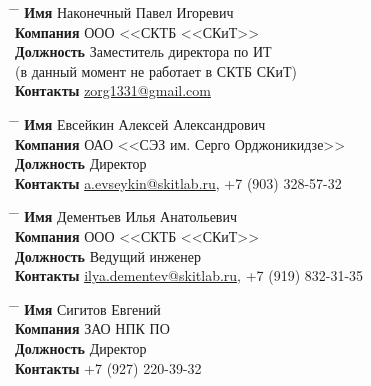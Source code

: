 \parbox{0.4\textwidth}{ %
\begin{tabbing}
\hspace{2.75cm} \= \hspace{4cm} \= \kill %
{\bf Имя} \> Наконечный Павел Игоревич \\ %
{\bf Компания} \> ООО <<СКТБ <<СКиТ>> \\ %
{\bf Должность} \> Заместитель директора по ИТ\\
(в данный момент не работает в СКТБ СКиТ) \\ %
{\bf Контакты} \> \href{mailto:zorg1331@gmail.com}{zorg1331@gmail.com} %
\end{tabbing}}
\hfill %
\parbox{0.4\textwidth}{ %
\begin{tabbing}
\hspace{2.75cm} \= \hspace{4cm} \= \kill %
{\bf Имя} \> Евсейкин Алексей Александрович \\ %
{\bf Компания} \> ОАО <<СЭЗ им. Серго Орджоникидзе>> \\ %
{\bf Должность} \> Директор \\ %
{\bf Контакты} \> \href{mailto:a.evseykin@skitlab.ru}{a.evseykin@skitlab.ru}, +7 (903) 328-57-32 %
\end{tabbing}}
\hfill %
\parbox{0.4\textwidth}{ %
\begin{tabbing}
\hspace{2.75cm} \= \hspace{4cm} \= \kill %
{\bf Имя} \> Дементьев Илья Анатольевич\\ %
{\bf Компания} \> ООО <<СКТБ <<СКиТ>> \\ %
{\bf Должность} \> Ведущий инженер \\ %
{\bf Контакты} \> \href{mailto:ilya.dementev@skitlab.ru}{ilya.dementev@skitlab.ru}, +7 (919) 832-31-35 %
\end{tabbing}}
\hfill %
\parbox{0.4\textwidth}{ %
\begin{tabbing}
\hspace{2.75cm} \= \hspace{4cm} \= \kill %
{\bf Имя} \> Сигитов Евгений\\ %
{\bf Компания} \> ЗАО НПК ПО \\ %
{\bf Должность} \> Директор \\ %
{\bf Контакты} \> +7 (927) 220-39-32 %
\end{tabbing}}



